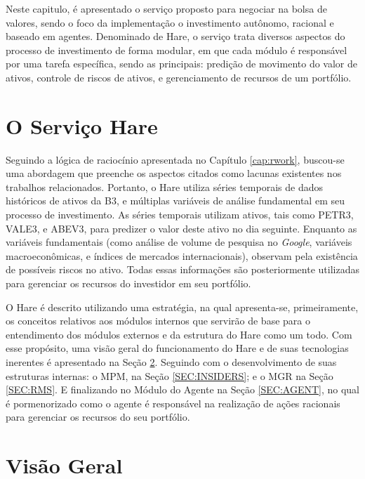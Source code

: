 \label{cap_dev}

Neste capitulo, é apresentado o serviço proposto para negociar na bolsa de valores, sendo o foco da implementação o investimento autônomo, racional e baseado em agentes. Denominado de Hare, o serviço trata diversos aspectos do processo de investimento de forma modular, em que cada módulo é responsável por uma tarefa específica, sendo as principais: predição de movimento do valor de ativos, controle de riscos de ativos, e gerenciamento de recursos de um portfólio. 

\section{O Serviço Hare}
\label{SEC:SYSTEM}

Seguindo a lógica de raciocínio apresentada no Capítulo \ref{cap:rwork}, buscou-se uma abordagem que preenche os aspectos citados como lacunas existentes nos trabalhos relacionados. Portanto, o Hare utiliza séries temporais de dados históricos de ativos da B3, e múltiplas variáveis de análise fundamental em seu processo de investimento. As séries temporais utilizam ativos, tais como PETR3, VALE3, e ABEV3, para predizer o valor deste ativo no dia seguinte. Enquanto as variáveis fundamentais (como análise de volume de pesquisa no \emph{Google}, variáveis macroeconômicas, e índices de mercados internacionais), observam pela existência de possíveis riscos no ativo. Todas essas informações são posteriormente utilizadas para gerenciar os recursos do investidor em seu portfólio.

O Hare é descrito utilizando uma estratégia, na qual apresenta-se, primeiramente, os conceitos relativos aos módulos internos que servirão de base para o entendimento dos módulos externos e da estrutura do Hare como um todo. Com esse propósito, uma visão geral do funcionamento do Hare e de suas tecnologias inerentes é apresentado na Seção \ref{SEC:OVERVIEW}. Seguindo com o desenvolvimento de suas estruturas internas: o \acrlong{MPM}, na Seção \ref{SEC:INSIDERS}; e o \acrlong{MGR} na Seção \ref{SEC:RMS}. E finalizando no Módulo do Agente na Seção \ref{SEC:AGENT}, no qual é pormenorizado como o agente é responsável na realização de ações racionais para gerenciar os recursos do seu portfólio.


\section{Visão Geral}
\label{SEC:OVERVIEW}

